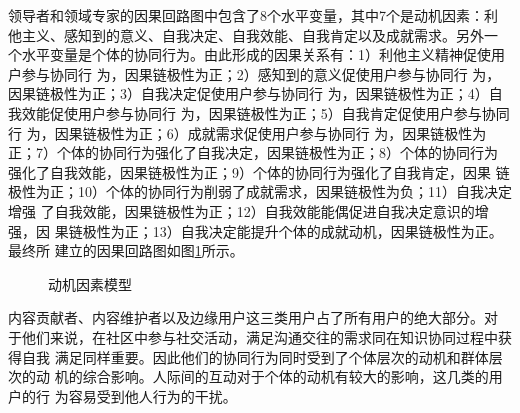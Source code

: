 领导者和领域专家的因果回路图中包含了8个水平变量，其中7个是动机因素：利
他主义、感知到的意义、自我决定、自我效能、自我肯定以及成就需求。另外一
个水平变量是个体的协同行为。由此形成的因果关系有：1）利他主义精神促使用户参与协同行
为，因果链极性为正；2）感知到的意义促使用户参与协同行
为，因果链极性为正；3）自我决定促使用户参与协同行
为，因果链极性为正；4）自我效能促使用户参与协同行
为，因果链极性为正；5）自我肯定促使用户参与协同行
为，因果链极性为正；6）成就需求促使用户参与协同行
为，因果链极性为正；7）个体的协同行为强化了自我决定，因果链极性为正；8）个体的协同行为
强化了自我效能，因果链极性为正；9）个体的协同行为强化了自我肯定，因果
链极性为正；10）个体的协同行为削弱了成就需求，因果链极性为负；11）自我决定增强
了自我效能，因果链极性为正；12）自我效能能偶促进自我决定意识的增强，因
果链极性为正；13）自我决定能提升个体的成就动机，因果链极性为正。最终所
建立的因果回路图如图\ref{fig:motive1}所示。
\begin{figure}[htb]
  \centering
  \caption{\small{动机因素模型}}
  \label{fig:motive1}
\end{figure}

内容贡献者、内容维护者以及边缘用户这三类用户占了所有用户的绝大部分。对
于他们来说，在社区中参与社交活动，满足沟通交往的需求同在知识协同过程中获得自我
满足同样重要。因此他们的协同行为同时受到了个体层次的动机和群体层次的动
机的综合影响。人际间的互动对于个体的动机有较大的影响，这几类的用户的行
为容易受到他人行为的干扰。

